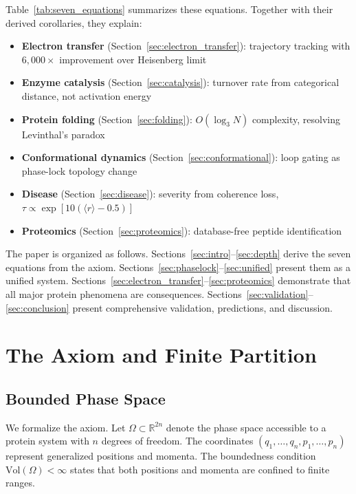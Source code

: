 \documentclass[aps,prx,superscriptaddress,twocolumn,10pt,a4paper,longbibliography,preprint]{revtex4-2}
\newcommand{\orderp}{\langle r \rangle}
\theoremstyle{definition}
\theoremstyle{remark}
\begin{document}
Table~\ref{tab:seven_equations} summarizes these equations. Together with their derived corollaries, they explain:
\begin{itemize}
\item \textbf{Electron transfer} (Section~\ref{sec:electron_transfer}): trajectory tracking with $6{,}000\times$ improvement over Heisenberg limit
\item \textbf{Enzyme catalysis} (Section~\ref{sec:catalysis}): turnover rate from categorical distance, not activation energy
\item \textbf{Protein folding} (Section~\ref{sec:folding}): $O(\log_3 N)$ complexity, resolving Levinthal's paradox
\item \textbf{Conformational dynamics} (Section~\ref{sec:conformational}): loop gating as phase-lock topology change
\item \textbf{Disease} (Section~\ref{sec:disease}): severity from coherence loss, $\tau \propto \exp[10(\orderp - 0.5)]$
\item \textbf{Proteomics} (Section~\ref{sec:proteomics}): database-free peptide identification
\end{itemize}

The paper is organized as follows. Sections~\ref{sec:intro}--\ref{sec:depth} derive the seven equations from the axiom. Sections~\ref{sec:phaselock}--\ref{sec:unified} present them as a unified system. Sections~\ref{sec:electron_transfer}--\ref{sec:proteomics} demonstrate that all major protein phenomena are consequences. Sections~\ref{sec:validation}--\ref{sec:conclusion} present comprehensive validation, predictions, and discussion.

\section{The Axiom and Finite Partition}
\label{sec:axiom_section}

\subsection{Bounded Phase Space}

We formalize the axiom. Let $\Omega \subset \mathbb{R}^{2n}$ denote the phase space accessible to a protein system with $n$ degrees of freedom. The coordinates $(q_1, \ldots, q_n, p_1, \ldots, p_n)$ represent generalized positions and momenta. The boundedness condition $\mathrm{Vol}(\Omega) < \infty$ states that both positions and momenta are confined to finite ranges.
\end{document}
